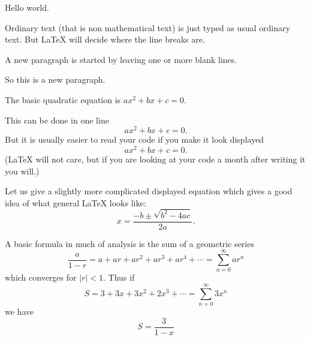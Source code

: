 \documentclass{article}  %
\begin{document}


Hello world.   



Ordinary text (that is non mathematical text) is just typed
as usual ordinary text.  But LaTeX will decide where the line
breaks are.

A new paragraph is started by leaving one or more blank lines.

So this is a new paragraph.



The basic quadratic equation is \(ax^2 + bx + c =0\).  



This can be done in one line \[ ax^2+bx+c=0. \]
But it is usually easier to read your code if you make it look
displayed 
\[
  ax^2+bx+c=0.
\]
(LaTeX will not care, but if you are looking at your code a month after
writing it you will.)

Let us give a slightly more complicated displayed equation
which gives a good idea of what general LaTeX looks like:
\[
	x = \frac{-b \pm \sqrt{b^2-4ac}}{2a}.
\]

A basic formula in much of analysis is the sum of a geometric 
series
\[
   \frac{a}{1-r}= a+ar + ar^2 + ar^3 + ar^4+ \cdots = \sum_{n=0}^\infty ar^n
\]
which converges for $|r|<1$.
Thus if
\[
	S = 3 + 3 x + 3 x^2 + 2 x^3 + \cdots = \sum_{n=0}^\infty 3x^n
\]
we have
\[
      S =   \frac{3}{1-x} 
\]
\end{document}
